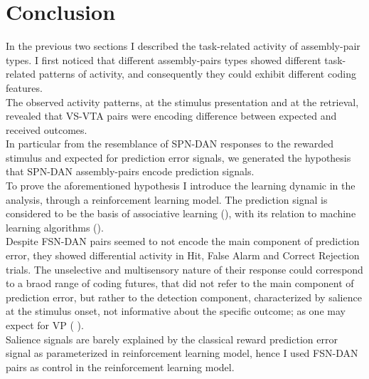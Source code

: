 \section{Conclusion}
In the previous two sections I described the task-related activity of assembly-pair types. I first noticed that different assembly-pairs types showed different task-related patterns of activity, and consequently they could exhibit different coding features.\\The observed activity patterns, at the stimulus presentation and at the retrieval, revealed that VS-VTA pairs were encoding difference between expected and received outcomes.\\In particular from the resemblance of SPN-DAN responses to the rewarded stimulus and expected for prediction error signals, we generated the hypothesis that SPN-DAN assembly-pairs encode prediction signals.\\To prove the aforementioned hypothesis I introduce the learning dynamic in the analysis, through a reinforcement learning model. The prediction signal is considered to be the basis of associative learning (\cite{RescorlaWagner}), with its relation to machine learning algorithms (\cite{SuttonBarto}).\\Despite FSN-DAN pairs seemed to not encode the main component of prediction error, they showed differential activity in Hit, False Alarm and Correct Rejection trials. The unselective and multisensory nature of their response could correspond to a braod range of coding futures, that did not refer to the main component of prediction error, but rather to the detection component, characterized by salience at the stimulus onset, not informative about the specific outcome; as one may expect for VP (\cite{TianHuang} \cite{Berridge}).\\Salience signals are barely explained by the classical reward prediction error signal as parameterized in reinforcement learning model, hence I used FSN-DAN pairs as control in the reinforcement learning model.